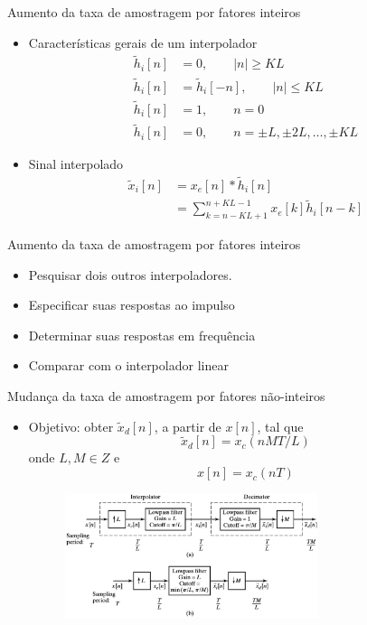 \begin{slide}{Aumento da taxa de amostragem por fatores inteiros}
	\begin{itemize}
		\item Características gerais de um interpolador
			\begin{align*}
				\tilde h_i[n]&= 0, \qquad |n|\geq KL\\
				\tilde h_i[n]&= \tilde h_i[-n], \qquad |n|\leq KL\\
				\tilde h_i[n]&= 1, \qquad n=0\\
				\tilde h_i[n]&= 0, \qquad n=\pm L, \pm 2L,\dots, \pm KL
			\end{align*}
		\item Sinal interpolado
			\begin{align*}
				\tilde x_i[n] &= x_e[n] * \tilde h_i[n]\\
				              &= \sum_{k= n-KL+1}^{n+KL-1} x_e[k]\tilde h_i[n-k]
			\end{align*}
	\end{itemize}
\end{slide}
\begin{slide}{Aumento da taxa de amostragem por fatores inteiros}
	\begin{itemize}
		\item Pesquisar dois outros interpoladores.
		\item Especificar suas respostas ao impulso
		\item Determinar suas respostas em frequência
		\item Comparar com o interpolador linear
	\end{itemize}
\end{slide}

\begin{slide}{Mudança da taxa de amostragem por fatores não-inteiros}
	\begin{itemize}
		\item Objetivo: obter $\tilde x_d[n]$, a partir de $x[n]$, tal que 
			\begin{equation*}
				\tilde x_d[n] = x_c(nMT/L)
			\end{equation*}
			onde $L, M \in Z$ e 
			\begin{equation*}
				x[n] = x_c(nT)
			\end{equation*}
			\begin{figure}
				\centering
				\includegraphics[width=0.7\textwidth]{figs/4-29.eps}
		        \end{figure}
	\end{itemize}
\end{slide}

